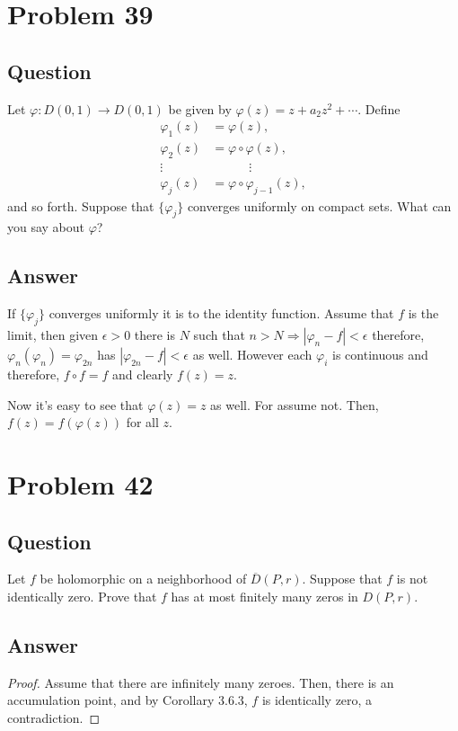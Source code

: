 \documentclass[11pt]{article}
\begin{document}
\section{Problem 39}
\subsection{Question}
Let $\varphi: D(0,1) \to D(0,1)$ be given by $\varphi(z) = z + a_2 z^2 + \cdots .$ Define
\begin{align*}
\varphi_1(z) &= \varphi(z),\\
\varphi_2(z) &= \varphi \circ \varphi(z),\\
\vdots \quad  &\quad \quad \quad\vdots \\
\varphi_j(z) &= \varphi \circ \varphi_{j-1} (z),
\end{align*}
and so forth. Suppose that $\{\varphi_j\}$ converges uniformly on compact sets. What can you say about $\varphi$?
\subsection{Answer}
If $\{ \varphi_j \}$ converges uniformly it is to the identity function. Assume that $f$ is the limit, then given $\epsilon >0$ there is $N$ such that $n> N \Rightarrow |\varphi_n - f | < \epsilon$ therefore, $\varphi_n(\varphi_n) = \varphi_{2n}$ has $|\varphi_{2n} - f| < \epsilon$ as well. However each $\varphi_i$ is continuous and therefore, $f \circ f = f$ and clearly $f(z) = z$.

Now it's easy to see that $\varphi(z) =z$ as well. For assume not. Then, $f(z) = f(\varphi(z))$ for all $z$.


\section{Problem 42}
\subsection{Question}
Let $f$ be holomorphic on a neighborhood of $\overline{D}(P,r)$. Suppose that $f$ is not identically zero. Prove that $f$ has at most finitely many zeros in $D(P,r)$.
\subsection{Answer}
\begin{proof}Assume that there are infinitely many zeroes. Then, there is an accumulation point, and by Corollary 3.6.3, $f$ is identically zero, a contradiction.\end{proof}
\end{document}
